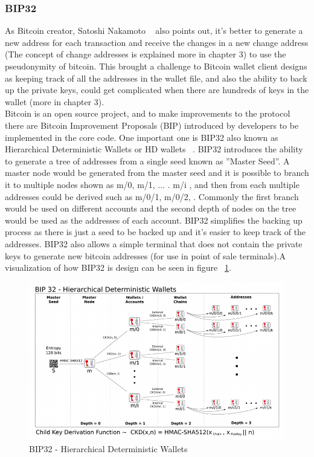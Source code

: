\subsubsection{BIP32}
As Bitcoin creator, Satoshi Nakamoto ~\cite{Nak08} also points out, it's better to generate a new address for each transaction and receive the changes in a new change address (The concept of change addresses is explained more in chapter 3) to use the pseudonymity of bitcoin. This brought a challenge to Bitcoin wallet client designs as keeping track of all the addresses in the wallet file, and also the ability to back up the private keys, could get complicated when there are hundreds of keys in the wallet (more in chapter 3). \\
Bitcoin is an open source project, and to make improvements to the protocol there are Bitcoin Improvement Proposals (BIP) introduced by developers to be implemented in the core code. One important one is BIP32 also known as Hierarchical Deterministic Wallets or HD wallets ~\cite{bip32}. BIP32 introduces the ability to generate a tree of addresses from a single seed known as ''Master Seed''. A master node would be generated from the master seed and it is possible to branch it to multiple nodes shown as m/0, m/1, ... . m/i , and then from each multiple addresses could be derived such as m/0/1, m/0/2, \etc. Commonly the first branch would be used on different accounts and the second depth of nodes on the tree would be used as the addresses of each account. BIP32 simplifies the backing up process as there is just a seed to be backed up and it's easier to keep track of the addresses. BIP32 also allows a simple terminal that does not contain the private keys to generate new bitcoin addresses (for use in point of sale terminals).A visualization of how BIP32 is design can be seen in figure ~\ref{fig:bip32}.

\begin{figure}[htb]
\centering
\includegraphics[width=\linewidth]{fig/bip32derivation.png}
  \caption{BIP32 - Hierarchical Deterministic Wallets ~\cite{bip32proposal}}
\label{fig:bip32}
\end{figure}


